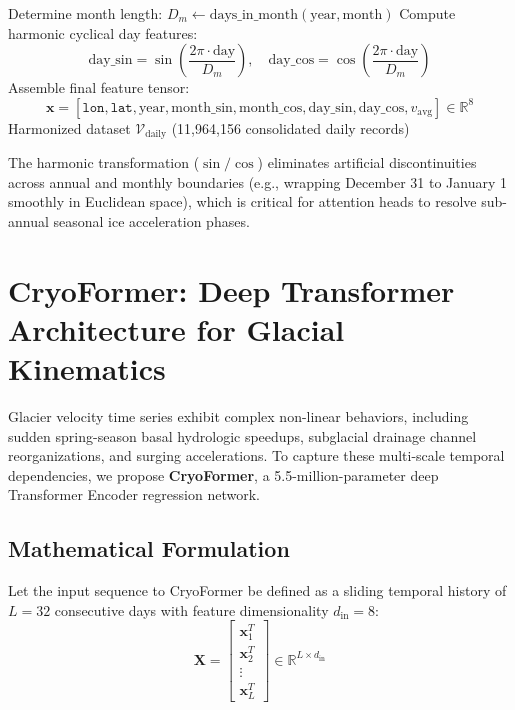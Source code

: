 \documentclass{mnnit}
\begin{document}
\begin{algorithm}[ht]
\begin{algorithmic}[1]
\begin{equation*}
\end{equation*}
\STATE Determine month length: $D_m \leftarrow \text{days\_in\_month}(\text{year}, \text{month})$
\STATE Compute harmonic cyclical day features:
\begin{equation*}
    \text{day\_sin} = \sin\left(\frac{2\pi \cdot \text{day}}{D_m}\right), \quad \text{day\_cos} = \cos\left(\frac{2\pi \cdot \text{day}}{D_m}\right)
\end{equation*}
\STATE Assemble final feature tensor:
\begin{equation*}
    \mathbf{x} = \left[\texttt{lon}, \texttt{lat}, \text{year}, \text{month\_sin}, \text{month\_cos}, \text{day\_sin}, \text{day\_cos}, v_{\text{avg}}\right] \in \mathbb{R}^8
\end{equation*}
\RETURN Harmonized dataset $\mathcal{V}_{\text{daily}}$ (11,964,156 consolidated daily records)
\end{algorithmic}
\end{algorithm}

The harmonic transformation ($\sin/\cos$) eliminates artificial discontinuities across annual and monthly boundaries (e.g., wrapping December 31 to January 1 smoothly in Euclidean space), which is critical for attention heads to resolve sub-annual seasonal ice acceleration phases.

\section{CryoFormer: Deep Transformer Architecture for Glacial Kinematics}
Glacier velocity time series exhibit complex non-linear behaviors, including sudden spring-season basal hydrologic speedups, subglacial drainage channel reorganizations, and surging accelerations. To capture these multi-scale temporal dependencies, we propose \textbf{CryoFormer}, a 5.5-million-parameter deep Transformer Encoder regression network.

\subsection{Mathematical Formulation}
Let the input sequence to CryoFormer be defined as a sliding temporal history of $L = 32$ consecutive days with feature dimensionality $d_{\text{in}} = 8$:
\begin{equation}
    \mathbf{X} = \begin{bmatrix} \mathbf{x}_1^T \\ \mathbf{x}_2^T \\ \vdots \\ \mathbf{x}_L^T \end{bmatrix} \in \mathbb{R}^{L \times d_{\text{in}}}
\end{equation}
\end{document}

